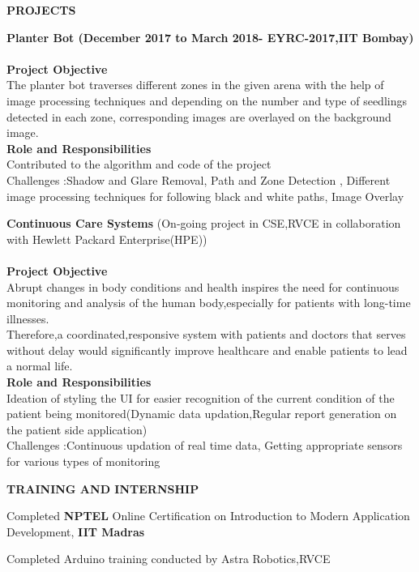 \documentclass[letterpaper,11pt,oneside]{article}
\begin{document}
\vspace{5ex}

\noindent\textbf{{\normalsize PROJECTS}} \begin{enumerate}
	\item 
	\small {\textbf{Planter Bot (December 2017 to March 2018- EYRC-2017,IIT Bombay)}\\\\
		\textbf{Project Objective}\\
		The planter bot traverses different zones in the given arena with the help of image processing techniques
		and depending on the number and type of seedlings detected in each zone, corresponding images are overlayed on the background image.\\
		\textbf{Role and Responsibilities}\\
		Contributed to the algorithm and code of the project\\
		Challenges :Shadow and Glare Removal, Path and Zone Detection , Different image processing techniques for following black and white paths, Image Overlay
		
		\item \textbf{Continuous Care Systems}
		(On-going project in CSE,RVCE in collaboration with Hewlett Packard Enterprise(HPE))\\\\
		\textbf{Project Objective}\\
		Abrupt changes in body conditions and health inspires the need for continuous monitoring and analysis of the human body,especially for patients with long-time illnesses.\\
		Therefore,a coordinated,responsive system with patients and doctors that serves without delay would significantly improve healthcare and enable patients to lead a normal life.\\
		\textbf{Role and Responsibilities}\\
		Ideation of styling the UI for easier recognition of the current condition of the patient being monitored(Dynamic data updation,Regular report generation on the patient side application)\\
		Challenges :Continuous updation of real time data, Getting appropriate sensors for various types of monitoring
	}
	
\end{enumerate}

\vspace{2ex}

\noindent\textbf{{\normalsize  TRAINING AND INTERNSHIP}} \begin{itemize}
	\small {\item 	Completed \textbf{NPTEL} Online Certification on Introduction to Modern Application Development, \textbf{IIT Madras}
		\item	Completed Arduino training conducted by Astra Robotics,RVCE
	}
\end{itemize}
\end{document}
